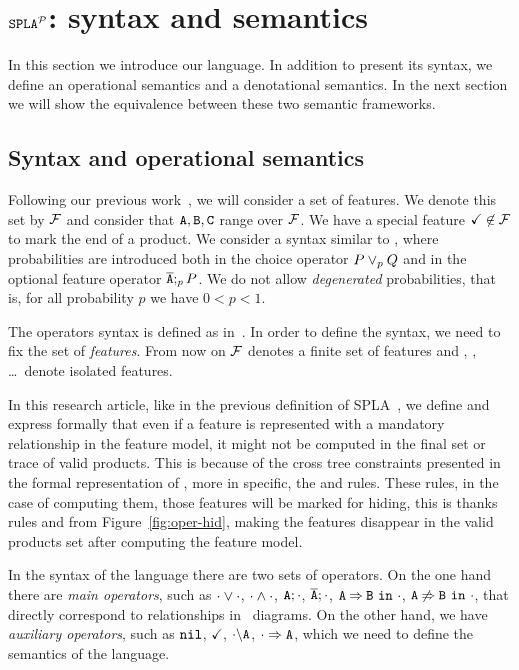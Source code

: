 \section{$\mathtt{SPLA{^{\cal P}}}$: syntax and semantics}
\label{sec:stat:sintaxMain}
In this section we introduce our language. In addition to present its syntax, we define an operational semantics and a denotational semantics. In the next section we will show the equivalence between these two semantic frameworks.


\subsection{Syntax and operational semantics}
\label{sec:stat:sintax}
Following our previous work~\cite{acl13,clc16}, we will consider a
set of features. We denote this set by ${\cal F}$ and consider that $\mathtt{A}, \mathtt{B},
\mathtt{C}$ range over ${\cal F}$. We have a special feature
$\checkmark\not\in{\cal F}$ to mark the end  of a product. We consider a syntax similar to
\fodaPA, where probabilities are introduced both in the choice operator $P \mathbin{\lor}_{p} Q $ and in
the optional feature operator $\overline{\mathtt{A}};_{p} P$. We do not allow
\emph{degenerated} probabilities, that is, for all probability $p$ we have $0< p<1$.

The operators syntax is defined as in~\cite{acl13,clc16}.
In order to define the syntax,
we need to fix the set of \emph{features}.
From now on ${\cal F}$ denotes a finite set  of features
and  , , \dots\ denote isolated features.


In this research article, like in the previous definition of SPLA~\cite{acl13,clc16},
we define and express formally that even if a feature is
represented with a mandatory relationship in the feature model,
it might not be computed in the final set or trace of valid products.
This is because of the cross tree constraints presented in the formal
representation of \fodaPA, more in specific, the  and  rules.
These rules, in the case of computing them, those features will be marked for hiding,
this is thanks rules  and  from
Figure~\ref{fig:oper-hid}, making the features
disappear in the valid products set after computing the feature model.



In the syntax of the language there are two sets of operators.
On the one hand there are \emph{main operators}, such as $\cdot\mathbin{\lor}\cdot$, $\cdot\mathbin{\wedge}\cdot$, $\mathtt{A};\cdot$, $\overline{\mathtt{A}};\cdot$,
$\mathtt{A}\mathbin{\Rightarrow}\mathtt{B}\ \mathtt{in}\ \cdot$, $\mathtt{A}\mathbin{\not\Rightarrow}\mathtt{B}\ \mathtt{in}\ \cdot$,
that directly correspond to relationships in \FODA\ diagrams.
On the other hand, we have \emph{auxiliary operators}, such as $\mathtt{nil}$, $\checkmark$, $\cdot\backslash\mathtt{A}$, $\cdot\Rightarrow\mathtt{A}$,
which we need to define the semantics of the language.


